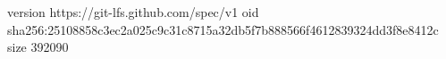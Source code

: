 version https://git-lfs.github.com/spec/v1
oid sha256:25108858c3ec2a025c9c31c8715a32db5f7b888566f4612839324dd3f8e8412c
size 392090
